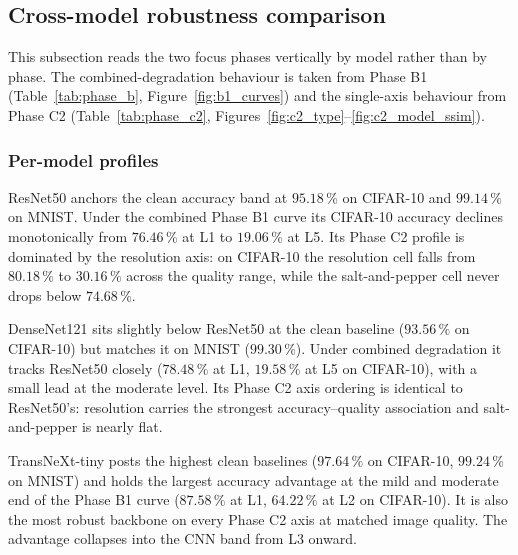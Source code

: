 \subsection{Cross-model robustness comparison}
\label{sec:crossmodel}

This subsection reads the two focus phases vertically by model rather than by
phase. The combined-degradation behaviour is taken from Phase B1
(Table~\ref{tab:phase_b}, Figure~\ref{fig:b1_curves}) and the single-axis
behaviour from Phase C2 (Table~\ref{tab:phase_c2},
Figures~\ref{fig:c2_type}--\ref{fig:c2_model_ssim}).

\subsubsection{Per-model profiles}
\label{sec:cm:profiles}

 ResNet50 anchors the clean accuracy band at $95.18\,\%$
on CIFAR-10 and $99.14\,\%$ on MNIST. Under the combined Phase B1 curve its
CIFAR-10 accuracy declines monotonically from $76.46\,\%$ at L1 to $19.06\,\%$
at L5. Its Phase C2 profile is dominated by the resolution axis: on CIFAR-10
the resolution cell falls from $80.18\,\%$ to $30.16\,\%$ across the quality
range, while the salt-and-pepper cell never drops below $74.68\,\%$.

 DenseNet121 sits slightly below ResNet50 at the
clean baseline ($93.56\,\%$ on CIFAR-10) but matches it on MNIST
($99.30\,\%$). Under combined degradation it tracks ResNet50 closely
($78.48\,\%$ at L1, $19.58\,\%$ at L5 on CIFAR-10), with a small lead at the
moderate level. Its Phase C2 axis ordering is identical to ResNet50's:
resolution carries the strongest accuracy--quality association and
salt-and-pepper is nearly flat.

 TransNeXt-tiny posts the highest clean baselines
($97.64\,\%$ on CIFAR-10, $99.24\,\%$ on MNIST) and holds the largest accuracy
advantage at the mild and moderate end of the Phase B1 curve ($87.58\,\%$ at
L1, $64.22\,\%$ at L2 on CIFAR-10). It is also the most robust backbone on
every Phase C2 axis at matched image quality. The advantage collapses into the
CNN band from L3 onward.

